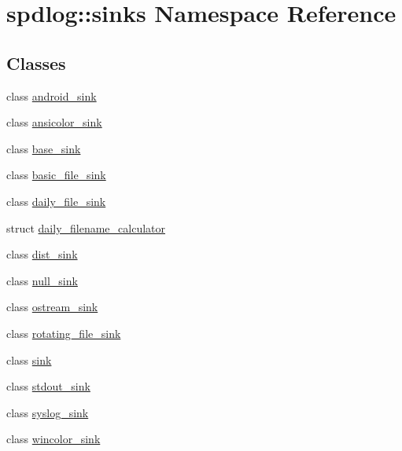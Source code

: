 \hypertarget{namespacespdlog_1_1sinks}{}\section{spdlog\+:\+:sinks Namespace Reference}
\label{namespacespdlog_1_1sinks}
\subsection*{Classes}
\begin{DoxyCompactItemize}
\item 
class \hyperlink{classspdlog_1_1sinks_1_1android__sink}{android\+\_\+sink}
\item 
class \hyperlink{classspdlog_1_1sinks_1_1ansicolor__sink}{ansicolor\+\_\+sink}
\item 
class \hyperlink{classspdlog_1_1sinks_1_1base__sink}{base\+\_\+sink}
\item 
class \hyperlink{classspdlog_1_1sinks_1_1basic__file__sink}{basic\+\_\+file\+\_\+sink}
\item 
class \hyperlink{classspdlog_1_1sinks_1_1daily__file__sink}{daily\+\_\+file\+\_\+sink}
\item 
struct \hyperlink{structspdlog_1_1sinks_1_1daily__filename__calculator}{daily\+\_\+filename\+\_\+calculator}
\item 
class \hyperlink{classspdlog_1_1sinks_1_1dist__sink}{dist\+\_\+sink}
\item 
class \hyperlink{classspdlog_1_1sinks_1_1null__sink}{null\+\_\+sink}
\item 
class \hyperlink{classspdlog_1_1sinks_1_1ostream__sink}{ostream\+\_\+sink}
\item 
class \hyperlink{classspdlog_1_1sinks_1_1rotating__file__sink}{rotating\+\_\+file\+\_\+sink}
\item 
class \hyperlink{classspdlog_1_1sinks_1_1sink}{sink}
\item 
class \hyperlink{classspdlog_1_1sinks_1_1stdout__sink}{stdout\+\_\+sink}
\item 
class \hyperlink{classspdlog_1_1sinks_1_1syslog__sink}{syslog\+\_\+sink}
\item 
class \hyperlink{classspdlog_1_1sinks_1_1wincolor__sink}{wincolor\+\_\+sink}
\end{DoxyCompactItemize}
